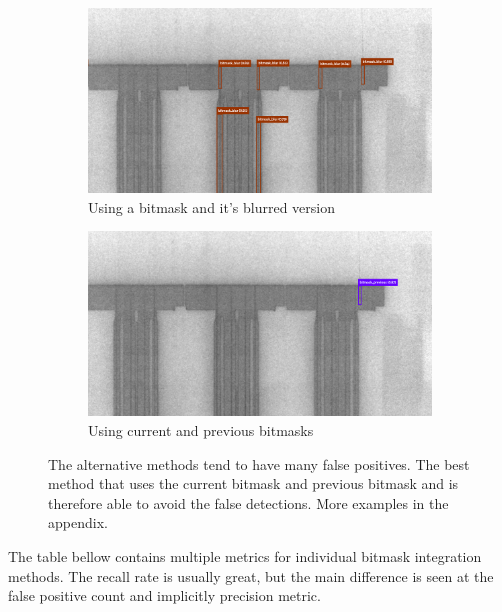 \begin{figure}[!h]
\centering

\begin{subfigure}{.6\textwidth}
  \centering
  \includegraphics[width=\linewidth]{images/implementation/results/bm/bm_blur}
  \caption{Using a bitmask and it's blurred version}
\end{subfigure}

\begin{subfigure}{.6\textwidth}
  \centering
  \includegraphics[width=\linewidth]{images/implementation/results/bm/bm_prev}
  \caption{Using current and previous bitmasks}
\end{subfigure}
\caption{The alternative methods tend to have many false positives. The best method that uses the current bitmask and previous bitmask and is therefore able to avoid the false detections. More examples in the appendix.}
\label{impl:bm_compare}
\end{figure}


The table bellow contains multiple metrics for individual bitmask integration methods. The recall rate is usually great, but the main difference is seen at the false positive count and implicitly precision metric.

